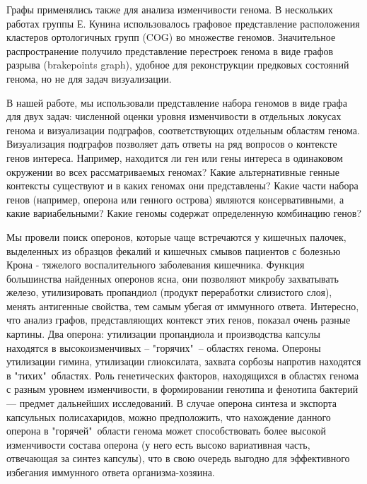 Графы применялись также для анализа изменчивости генома. В нескольких работах группы Е. Кунина использовалось графовое представление расположения кластеров ортологичных групп (COG) во множестве геномов. Значительное распространение получило представление перестроек генома в виде графов разрыва (brakepoints graph), удобное для реконструкции предковых состояний генома, но не для задач визуализации. 

В нашей работе, мы использовали представление набора геномов в виде графа для двух задач: численной оценки уровня изменчивости в отдельных локусах генома и визуализации подграфов, соответствующих отдельным областям генома. Визуализация подграфов позволяет дать ответы на ряд вопросов о контексте генов интереса. Например, находится ли ген или гены интереса в одинаковом окружении во всех рассматриваемых геномах? Какие альтернативные генные контексты существуют и в каких геномах они представлены? Какие части набора генов (например, оперона или генного острова) являются консервативными, а какие вариабельными? Какие геномы содержат определенную комбинацию генов? 

Мы провели поиск оперонов, которые чаще встречаются у кишечных палочек, выделенных из образцов фекалий и кишечных смывов пациентов с болезнью Крона - тяжелого воспалительного заболевания кишечника. Функция большинства найденных оперонов ясна, они позволяют микробу захватывать железо, утилизировать пропандиол (продукт переработки слизистого слоя), менять антигенные свойства, тем самым убегая от иммунного ответа. Интересно, что анализ графов, представляющих контекст этих генов, показал очень разные картины. Два оперона: утилизации пропандиола и производства капсулы находятся в высокоизменчивых -- "горячих"\ -- областях генома. Опероны утилизации гимина, утилизации глиоксилата, захвата сорбозы напротив находятся в "тихих"\ областях. Роль генетических факторов, находящихся в областях генома с разным уровнем изменчивости, в формировании генотипа и фенотипа бактерий --- предмет дальнейших исследований. В случае оперона синтеза и экспорта капсульных полисахаридов, можно предположить, что нахождение данного оперона в "горячей"\ области генома может способствовать более высокой изменчивости состава оперона (у него есть высоко вариативная часть, отвечающая за синтез капсулы), что в свою очередь выгодно для эффективного избегания иммунного ответа организма-хозяина.

